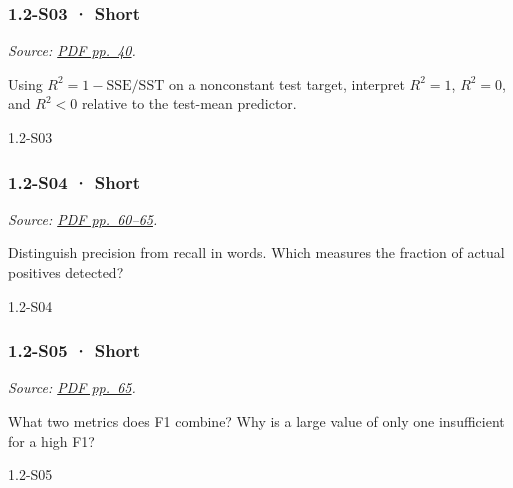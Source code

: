 \noindent\begin{minipage}{\linewidth}

\subsubsection{1.2-S03 · Short}\label{s03-short-1}

\emph{Source:
\href{../Lecture\%20Slides/1.2.\%20Shallow\%20Learning.pdf\#page=40}{PDF
pp.~40}.}

Using \(R^2=1-\mathrm{SSE}/\mathrm{SST}\) on a nonconstant test target,
interpret \(R^2=1\), \(R^2=0\), and \(R^2<0\) relative to the test-mean
predictor.

\begin{solution}[20mm]{1.2-S03}

\end{solution}
\end{minipage}\par\medskip

\noindent\begin{minipage}{\linewidth}

\subsubsection{1.2-S04 · Short}\label{s04-short-1}

\emph{Source:
\href{../Lecture\%20Slides/1.2.\%20Shallow\%20Learning.pdf\#page=60}{PDF
pp.~60--65}.}

Distinguish precision from recall in words. Which measures the fraction
of actual positives detected?

\begin{solution}[20mm]{1.2-S04}

\end{solution}
\end{minipage}\par\medskip

\noindent\begin{minipage}{\linewidth}

\subsubsection{1.2-S05 · Short}\label{s05-short-1}

\emph{Source:
\href{../Lecture\%20Slides/1.2.\%20Shallow\%20Learning.pdf\#page=65}{PDF
pp.~65}.}

What two metrics does F1 combine? Why is a large value of only one
insufficient for a high F1?

\begin{solution}[20mm]{1.2-S05}

\end{solution}
\end{minipage}\par\medskip


